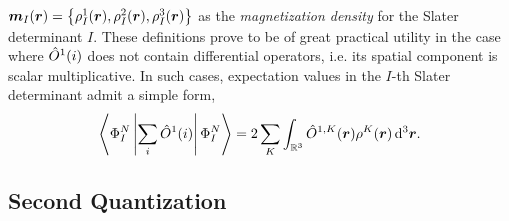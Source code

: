 $\boldsymbol{m}_I(\boldsymbol{r}) = \left \lbrace  \rho_I^1(\boldsymbol{r}), \rho_I^2(\boldsymbol{r}), \rho_I^3(\boldsymbol{r}) \right\rbrace$ as
the \emph{magnetization density} for the Slater determinant $I$.
These definitions
prove to be of great practical utility
in the case where $\hat{O}^1(i)$ does not contain differential operators, i.e. its spatial component is scalar
multiplicative. In such cases, expectation values in the $I$-th Slater determinant admit a simple form,
\begin{equation}
  \label{eq:DensityInner}
  \left\langle \Phi^N_I \left\vert \sum_i\hat{O}^1(i) \right\vert \Phi^N_I \right\rangle = 2\sum_K \int_{\mathbb R^3} \hat{O}^{1,K}(\boldsymbol{r}) \rho^K(\boldsymbol{r}) \,\mathrm{d}^3\boldsymbol{r}.
\end{equation}






\subsection{Second Quantization}
\label{sec:SQ}

